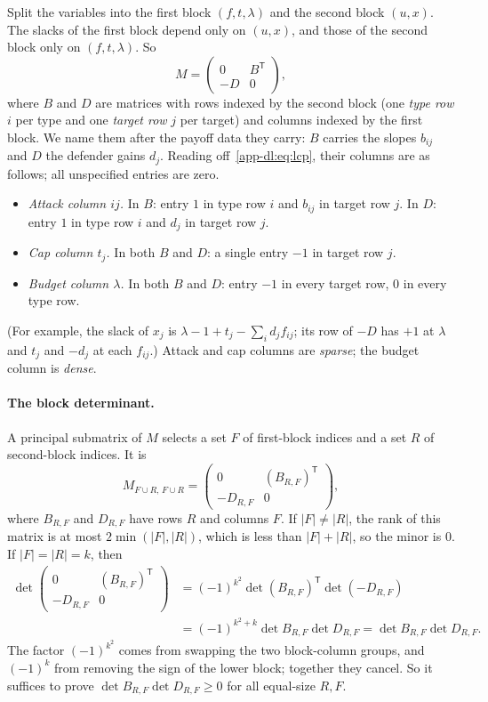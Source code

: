 Split the variables into the first block $(f,t,\lambda)$ and the second block $(u,x)$. The slacks of the
first block depend only on $(u,x)$, and those of the second block only on $(f,t,\lambda)$. So
\[
  M=\begin{pmatrix}0&B^{\mathsf T}\\-D&0\end{pmatrix},
\]
where $B$ and $D$ are matrices with rows indexed by the second block (one \emph{type row} $i$ per type and
one \emph{target row} $j$ per target) and columns indexed by the first block. We name them after the
payoff data they carry: $B$ carries the slopes $b_{ij}$ and $D$ the defender gains $d_j$.
Reading off~\eqref{app-dl:eq:lcp}, their columns are as follows; all unspecified entries are zero.
\begin{itemize}[nosep]
  \item \emph{Attack column $ij$.} In $B$: entry $1$ in type row $i$ and $b_{ij}$ in target row $j$. In
        $D$: entry $1$ in type row $i$ and $d_j$ in target row $j$.
  \item \emph{Cap column $t_j$.} In both $B$ and $D$: a single entry $-1$ in target row $j$.
  \item \emph{Budget column $\lambda$.} In both $B$ and $D$: entry $-1$ in every target row, $0$ in every
        type row.
\end{itemize}
(For example, the slack of $x_j$ is $\lambda-1+t_j-\sum_id_jf_{ij}$; its row of $-D$ has $+1$ at
$\lambda$ and $t_j$ and $-d_j$ at each $f_{ij}$.) Attack and cap columns are \emph{sparse}; the budget
column is \emph{dense}.

\paragraph{The block determinant.} A principal submatrix of $M$ selects a set $F$ of first-block indices
and a set $R$ of second-block indices. It is
\[
  M_{F\cup R,\,F\cup R}=\begin{pmatrix}0&(B_{R,F})^{\mathsf T}\\-D_{R,F}&0\end{pmatrix},
\]
where $B_{R,F}$ and $D_{R,F}$ have rows $R$ and columns $F$. If $|F|\ne|R|$, the rank of this
matrix is at most $2\min(|F|,|R|)$, which is less than $|F|+|R|$, so the minor is $0$. If $|F|=|R|=k$, then
\begin{equation}\label{app-dl:eq:blockdet}
\begin{aligned}
  \det\begin{pmatrix}0&(B_{R,F})^{\mathsf T}\\-D_{R,F}&0\end{pmatrix}
  &=(-1)^{k^2}\det(B_{R,F})^{\mathsf T}\det(-D_{R,F})\\
  &=(-1)^{k^2+k}\det B_{R,F}\det D_{R,F}=\det B_{R,F}\det D_{R,F}.
\end{aligned}
\end{equation}
The factor $(-1)^{k^2}$ comes from swapping the two block-column groups, and $(-1)^k$ from removing the
sign of the lower block; together they cancel. So it suffices to prove
$\det B_{R,F}\det D_{R,F}\ge0$ for all equal-size $R,F$.

